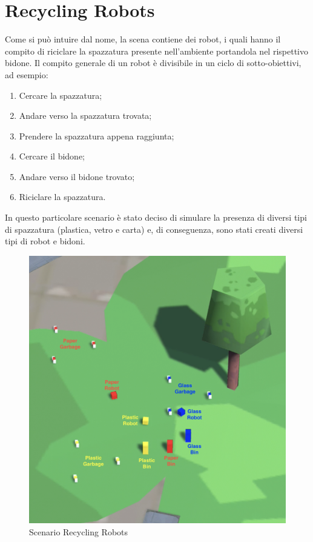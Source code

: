 \section{Recycling Robots}

Come si può intuire dal nome, la scena contiene dei robot, i quali hanno il compito di riciclare la spazzatura presente nell'ambiente portandola nel rispettivo bidone. Il compito generale di un robot è divisibile in un ciclo di sotto-obiettivi, ad esempio:
\begin{enumerate}
    \item Cercare la spazzatura;
    \item Andare verso la spazzatura trovata;
    \item Prendere la spazzatura appena raggiunta;
    \item Cercare il bidone;
    \item Andare verso il bidone trovato;
    \item Riciclare la spazzatura.
\end{enumerate}

In questo particolare scenario è stato deciso di simulare la presenza di diversi tipi di spazzatura (plastica, vetro e carta) e, di conseguenza, sono stati creati diversi tipi di robot e bidoni.

\begin{figure}[H]
\centering
\includegraphics[width=\textwidth]{figures/recycling_robots.png}
\caption{Scenario Recycling Robots}
\label{scenario_recycling_robots}
\end{figure}

